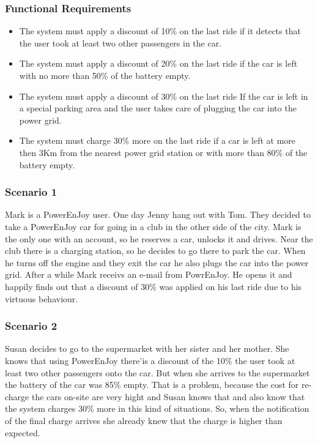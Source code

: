 \subsubsection{Functional Requirements}
\begin{itemize}
  \item The system must apply a discount of 10\% on the last ride if it detects that the user took at least two other passengers in the car.
  \item The system must apply a discount of 20\% on the last ride if the car is left with no more than 50\% of the battery empty.
  \item The system must apply a discount of 30\% on the last ride If the car is left in a special parking area and the user takes care of plugging the car into the power grid.
  \item The system must charge 30\% more on the last ride if a car is left at more then 3Km from the nearest power grid station or with more than 80\% of the battery empty.
\end{itemize}

\subsubsection{Scenario 1}
Mark is a PowerEnJoy user. One day Jenny hang out with Tom. They decided to take a PowerEnJoy car for going in a club in the other side of the city. Mark is the only one with an account, so he reserves a car, unlocks it and drives. Near the club there is a \gls{charging station}, so he decides to go there to park the car. When he turns off the engine and they exit the car he also plugs the car into the power grid. After a while Mark receivs an e-mail from PowrEnJoy. He opens it and happily finds out that a discount of 30\% was applied on his last ride due to his virtuous behaviour.

\subsubsection{Scenario 2}
Susan decides to go to the supermarket with her sister and her mother. She knows that using PowerEnJoy there'is a discount of the 10\% the user took at least two other passengers onto the car. But when she arrives to the supermarket the battery of the car was 85\% empty. That is a problem, because the cost for re-charge the cars on-site are very hight and Susan knows that and also know that the system charges 30\% more in this kind of situations. So, when the notification of the final charge arrives she already knew that the charge is higher than expected.


